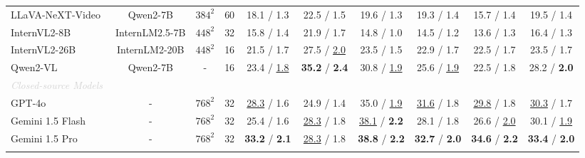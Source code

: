 \begin{table*}[t]
{\begin{threeparttable}
\begin{tabular}{l|c|c|c|ccccc|c}
LLaVA-NeXT-Video~\cite{zhang2024llavanextvideo} & Qwen2-7B &  $384^{2}$ & 60 & {18.1} / 1.3 & {22.5} / 1.5 & {19.6} / 1.3 & {19.3} / 1.4 & {15.7} / 1.4  & {19.5} / 1.4 \\ 
InternVL2-8B~\cite{chen2024far} & InternLM2.5-7B & $448^{2}$  & 32  & 15.8 / 1.4  &  21.9 / 1.7 & 14.8 / 1.0 & 14.5 / 1.2  & 13.6 / 1.3  & 16.4 / 1.3 \\
InternVL2-26B~\cite{chen2024far} & InternLM2-20B & $448^{2}$  & 16  & 21.5 / 1.7 & 27.5 / \underline{2.0}  & 23.5 / 1.5  & 22.9 / 1.7  & 22.5 / 1.7 & 23.5 / 1.7   \\ 
Qwen2-VL~\cite{wang2024qwen2} & Qwen2-7B & -  & 16  & 23.4 / \underline{1.8} & \textbf{35.2} / \textbf{2.4}  & 30.8 / \underline{1.9} & 25.6 / \underline{1.9} & 22.5 / 1.8  & 28.2 / \textbf{2.0} \\ 
\hline 
\multicolumn{10}{l}{{\emph{\textcolor{lightgray}{Closed-source Models}}}} \\
GPT-4o~\cite{achiam2023gpt}  & - & $768^{2}$ & 32  & \underline{28.3} / {1.6}  & 24.9 / 1.4  & 35.0 / \underline{1.9}  & \underline{31.6} / 1.8 & \underline{29.8} / 1.8 & \underline{30.3} / 1.7   \\ 
Gemini 1.5 Flash~\cite{reid2024gemini} & - & $768^{2}$ & 32 & 25.4 / 1.6 & \underline{28.3} / {1.8} &  \underline{38.1} / \textbf{2.2} &  28.1 / {1.8} & 26.6 / \underline{2.0} &  30.1 / \underline{1.9} \\ 
Gemini 1.5 Pro~\cite{reid2024gemini}  & - & $768^{2}$ & 32  & \textbf{33.2} / \textbf{2.1} &  \underline{28.3} / {1.8} &  \textbf{38.8} / \textbf{2.2} & \textbf{32.7} / \textbf{2.0}  & \textbf{34.6} / \textbf{2.2}  &  \textbf{33.4} / \textbf{2.0}  \\ 
\Xhline{1pt}
\end{tabular}
\vspace{-0.5cm}
\end{threeparttable}}
\end{table*}





